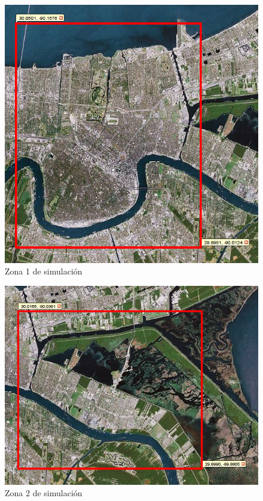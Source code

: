 \begin{figure}[H]
 \centering
 \includegraphics[width=120mm]{figuras/cap6/NOarea2.png}
 \caption{Zona 1 de simulación}
\end{figure}

\begin{figure}[H]
 \centering
 \includegraphics[width=135mm]{figuras/cap6/NOarea3.png}
 \caption{Zona 2 de simulación}
\end{figure}

